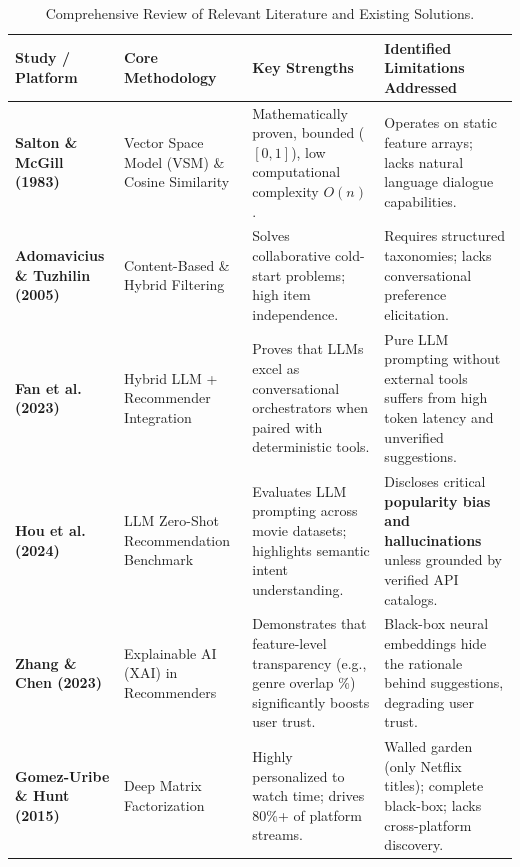\documentclass[11pt,a4paper]{article}
\begin{document}
\begin{table}[H]
\centering
\footnotesize
\begin{tabularx}{\textwidth}{p{3.4cm} p{3.2cm} X p{3.6cm}}
\toprule
\rowcolor{tableheader}
\textbf{Study / Platform} & \textbf{Core Methodology} & \textbf{Key Strengths} & \textbf{Identified Limitations Addressed} \\
\midrule
\textbf{Salton \& McGill (1983)} \cite{salton1983introduction} & Vector Space Model (VSM) \& Cosine Similarity & Mathematically proven, bounded ($[0,1]$), low computational complexity $O(n)$. & Operates on static feature arrays; lacks natural language dialogue capabilities. \\
\addlinespace
\textbf{Adomavicius \& Tuzhilin (2005)} \cite{adomavicius2005toward} & Content-Based \& Hybrid Filtering & Solves collaborative cold-start problems; high item independence. & Requires structured taxonomies; lacks conversational preference elicitation. \\
\addlinespace
\textbf{Fan et al. (2023)} \cite{fan2023recommender} & Hybrid LLM + Recommender Integration & Proves that LLMs excel as conversational orchestrators when paired with deterministic tools. & Pure LLM prompting without external tools suffers from high token latency and unverified suggestions. \\
\addlinespace
\textbf{Hou et al. (2024)} \cite{hou2024large} & LLM Zero-Shot Recommendation Benchmark & Evaluates LLM prompting across movie datasets; highlights semantic intent understanding. & Discloses critical \textbf{popularity bias and hallucinations} unless grounded by verified API catalogs. \\
\addlinespace
\textbf{Zhang \& Chen (2023)} \cite{zhang2023explainable} & Explainable AI (XAI) in Recommenders & Demonstrates that feature-level transparency (e.g., genre overlap \%) significantly boosts user trust. & Black-box neural embeddings hide the rationale behind suggestions, degrading user trust. \\
\addlinespace
\textbf{Gomez-Uribe \& Hunt (2015)} \cite{gomez2015netflix} & Deep Matrix Factorization & Highly personalized to watch time; drives 80\%+ of platform streams. & Walled garden (only Netflix titles); complete black-box; lacks cross-platform discovery. \\
\bottomrule
\end{tabularx}
\caption{Comprehensive Review of Relevant Literature and Existing Solutions.}
\label{tab:literature}
\end{table}
\end{document}
